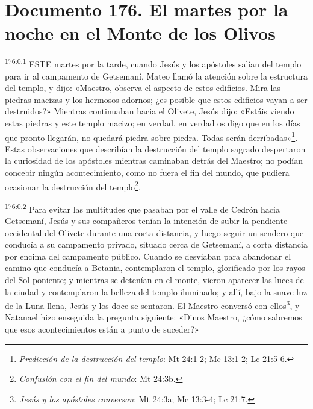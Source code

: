 \chapter{Documento 176. El martes por la noche en el Monte de los Olivos}
\par
\textsuperscript{176:0.1} ESTE martes por la tarde, cuando Jesús y los apóstoles salían del templo para ir al campamento de Getsemaní, Mateo llamó la atención sobre la estructura del templo, y dijo: «Maestro, observa el aspecto de estos edificios. Mira las piedras macizas y los hermosos adornos; ¿es posible que estos edificios vayan a ser destruidos?» Mientras continuaban hacia el Olivete, Jesús dijo: «Estáis viendo estas piedras y este templo macizo; en verdad, en verdad os digo que en los días que pronto llegarán, no quedará piedra sobre piedra. Todas serán derribadas»\footnote{\textit{Predicción de la destrucción del templo}: Mt 24:1-2; Mc 13:1-2; Lc 21:5-6.}. Estas observaciones que describían la destrucción del templo sagrado despertaron la curiosidad de los apóstoles mientras caminaban detrás del Maestro; no podían concebir ningún acontecimiento, como no fuera el fin del mundo, que pudiera ocasionar la destrucción del templo\footnote{\textit{Confusión con el fin del mundo}: Mt 24:3b.}.

\par
\textsuperscript{176:0.2} Para evitar las multitudes que pasaban por el valle de Cedrón hacia Getsemaní, Jesús y sus compañeros tenían la intención de subir la pendiente occidental del Olivete durante una corta distancia, y luego seguir un sendero que conducía a su campamento privado, situado cerca de Getsemaní, a corta distancia por encima del campamento público. Cuando se desviaban para abandonar el camino que conducía a Betania, contemplaron el templo, glorificado por los rayos del Sol poniente; y mientras se detenían en el monte, vieron aparecer las luces de la ciudad y contemplaron la belleza del templo iluminado; y allí, bajo la suave luz de la Luna llena, Jesús y los doce se sentaron. El Maestro conversó con ellos\footnote{\textit{Jesús y los apóstoles conversan}: Mt 24:3a; Mc 13:3-4; Lc 21:7.}, y Natanael hizo enseguida la pregunta siguiente: «Dinos Maestro, ¿cómo sabremos que esos acontecimientos están a punto de suceder?»

